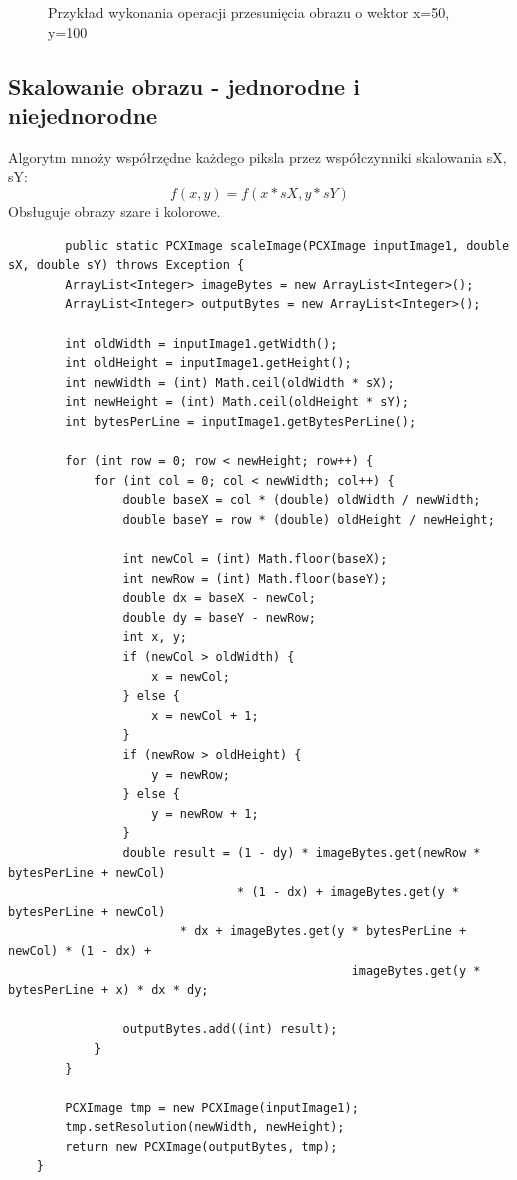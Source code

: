 \documentclass{article}
\begin{document}
\begin{figure}[!ht]
	\caption{Przykład wykonania operacji przesunięcia obrazu o wektor x=50, y=100}
	\label{fig10}	
	\end{figure}
	
	
	\subsection{Skalowanie obrazu - jednorodne i niejednorodne}
	Algorytm mnoży współrzędne każdego piksla przez współczynniki skalowania sX, sY:
	\begin{equation*}
	f(x,y)=f(x*sX,y*sY)
	\end{equation*}
	Obsługuje obrazy szare i kolorowe.
	\begin{verbatim}
	    public static PCXImage scaleImage(PCXImage inputImage1, double sX, double sY) throws Exception {
        ArrayList<Integer> imageBytes = new ArrayList<Integer>();
        ArrayList<Integer> outputBytes = new ArrayList<Integer>();

        int oldWidth = inputImage1.getWidth();
        int oldHeight = inputImage1.getHeight();
        int newWidth = (int) Math.ceil(oldWidth * sX);
        int newHeight = (int) Math.ceil(oldHeight * sY);
        int bytesPerLine = inputImage1.getBytesPerLine();

        for (int row = 0; row < newHeight; row++) {
            for (int col = 0; col < newWidth; col++) {
                double baseX = col * (double) oldWidth / newWidth;
                double baseY = row * (double) oldHeight / newHeight;

                int newCol = (int) Math.floor(baseX);
                int newRow = (int) Math.floor(baseY);
                double dx = baseX - newCol;
                double dy = baseY - newRow;
                int x, y;
                if (newCol > oldWidth) {
                    x = newCol;
                } else {
                    x = newCol + 1;
                }
                if (newRow > oldHeight) {
                    y = newRow;
                } else {
                    y = newRow + 1;
                }
                double result = (1 - dy) * imageBytes.get(newRow * bytesPerLine + newCol) 
								* (1 - dx) + imageBytes.get(y * bytesPerLine + newCol)
                        * dx + imageBytes.get(y * bytesPerLine + newCol) * (1 - dx) + 
												imageBytes.get(y * bytesPerLine + x) * dx * dy;

                outputBytes.add((int) result);
            }
        }

        PCXImage tmp = new PCXImage(inputImage1);
        tmp.setResolution(newWidth, newHeight);
        return new PCXImage(outputBytes, tmp);
    }
	\end{verbatim}
	
\end{document}
